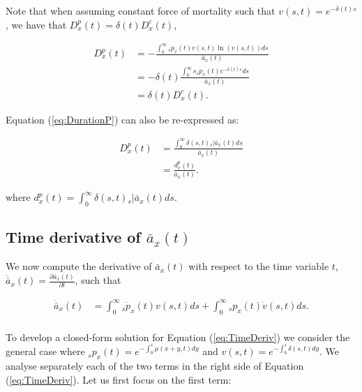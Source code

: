 \documentclass[12pt]{article}
\begin{document}
Note that when assuming constant force of mortality such that $v(s,t)=e^{-\delta(t)s}$, we have that ${D}^{p}_{x}(t)=\delta(t){D}^{c}_{x}(t)$,


\begin{equation}\label{eq:DurationCP}
\begin{split}
{D}^{p}_{x}(t) &= -\frac{\int_0^\infty {}_sp_x(t) v(s,t) \ln(v(s,t))ds}  {\bar{a}_x(t)} \\
&=- \delta(t)\frac{\int_0^\infty s{}_sp_x(t) e^{-\delta(t)s}  ds}{\bar{a}_x(t)} \\
& = \delta(t){D}^{c}_{x}(t).
\end{split}
\end{equation}

Equation (\ref{eq:DurationP}) can also be re-expressed as:

\begin{equation}\label{eq:DurationP2}
\begin{split}
{D}^{p}_{x}(t) &= \frac{\int_0^\infty \delta(s,t) {}_s|\bar{a}_x(t)ds} {\bar{a}_x(t)} \\
                 &= \frac{{d}^{p}_{x}(t)}{\bar{a}_x(t)}.
\end{split}
\end{equation}


where ${d}^{p}_{x}(t)=\int_0^\infty \delta(s,t) {}_s|\bar{a}_x(t) ds$. 




\subsection{Time derivative of $\bar{a}_x(t)$} \label{sec:timderiv}

We now compute the derivative of $\bar{a}_x(t)$ with respect to the time variable $t$, $\dot{\bar{a}} _x(t)=\frac{\partial \bar{a}_x(t)}{\partial t}$, such that

\begin{equation}\label{eq:TimeDeriv}
\begin{split}
\dot{\bar{a}} _x(t) &= \int_0^\infty {}_s\dot{p}_x(t) v(s,t)ds +\int_0^\infty {}_sp_x(t) \dot{v}(s,t)ds.\\
\end{split}
\end{equation}


To develop a closed-form solution for Equation (\ref{eq:TimeDeriv}) we consider the general case where $_sp_x(t)=e^{-\int_{0}^{s}\mu(x+y,t)dy}$ and ${v}(s,t)=e^{-\int_{0}^{s}\delta(s,t)dy}$. We analyse separately each of the two terms in the right side of Equation (\ref{eq:TimeDeriv}). Let us first focus on the first term:
\end{document}
